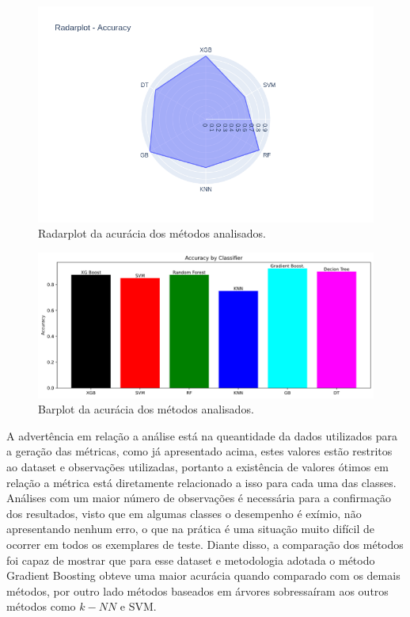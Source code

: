 \documentclass[
	article,			%
	11pt,				%
	oneside,			%
	a4paper,			%
	english,			%
	brazil,				%
	sumario=tradicional
	]{abntex2}
\begin{document}
\begin{figure}[H]
 \centering
 \includegraphics[scale=0.5]{fig/radarplot.png}
 \caption{Radarplot da acurácia dos métodos analisados.}
 \label{fig:radar}
\end{figure}

\begin{figure}[H]
 \centering
 \includegraphics[scale=0.4]{fig/barplot.png}
 \caption{Barplot da acurácia dos métodos analisados.}
 \label{fig:barplot}
\end{figure}

A advertência em relação a análise está na queantidade da dados utilizados para a geração das métricas, como já apresentado acima, estes valores estão restritos ao dataset e observações utilizadas, portanto a existência de valores ótimos em relação a métrica está diretamente relacionado a isso para cada uma das classes. Análises com um maior número de observações é necessária para a confirmação dos resultados, visto que em algumas classes o desempenho é exímio, não apresentando nenhum erro, o que na prática é uma situação muito difícil de ocorrer em todos os exemplares de teste. Diante disso, a comparação dos métodos foi capaz de mostrar que para esse dataset e metodologia adotada o método Gradient Boosting obteve uma maior acurácia quando comparado com os demais métodos, por outro lado métodos baseados em árvores sobressaíram aos outros métodos como $k-NN$ e SVM. 
\end{document}
